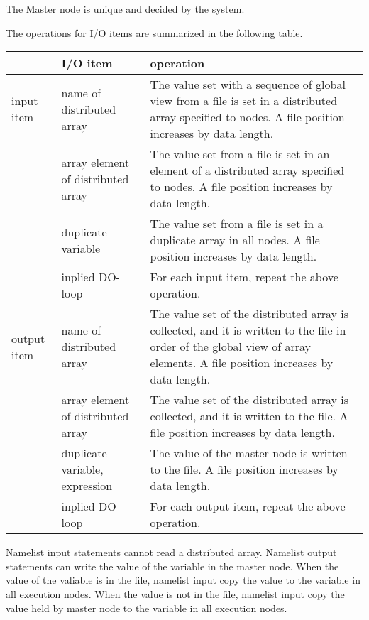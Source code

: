    The Master node is unique and decided by the system.

   The operations for I/O items are summarized in the following table.

   \begin{table}[h]
    \begin{center}
     \begin{tabular}{|l|l|p{40mm}|}
      \hline
      \multicolumn{1}{|c}{ }  & {\bf I/O item} & {\bf operation} \\
      \hline
      input item & name of distributed array & The value set with a sequence
	      of global view from a file is set in a distributed
	      array specified to nodes. A file position increases by
	      data length. \\
      \cline{2-3}
      & array element of distributed array & The value set from a file
	      is set in an element of a distributed array specified to
	      nodes. A file position increases by data length. \\
      \cline{2-3}
      & duplicate variable &  The value set from a file is set in a
	      duplicate array in all nodes. A file position increases by
	      data length. \\
      \cline{2-3}
      & inplied DO-loop & For each input item, repeat the above operation. \\
      \hline
      output item & name of distributed array & The value set of the
	      distributed array is collected, and it is written to the
	      file in order of the global view of array elements. A file
	      position increases by data length. \\
      \cline{2-3}
      & array element of distributed array &  The value set of the
	      distributed array is collected, and it is written to the
	      file. A file position increases by data length. \\
      \cline{2-3}
      & duplicate variable, expression & The value of the master node
	      is written to the file.  A file position increases by data
	      length. \\
      \cline{2-3}
      & inplied DO-loop & For each output item, repeat the above operation. \\
      \hline
      \end{tabular}
     \end{center}
    \label{tb:aaa}
   \end{table}

   Namelist input statements cannot read a distributed array. Namelist
   output statements can write the value of the variable in the master
   node. When the value of the valiable is in the file, namelist input
   copy the value to the variable in all execution nodes. When the value
   is not in the file, namelist input copy the value held by master node
   to the variable in all execution nodes.


